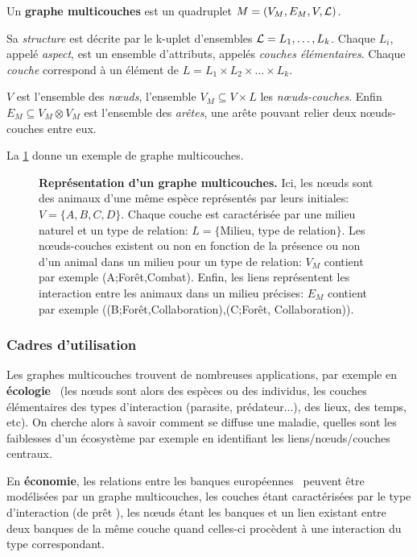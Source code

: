 \documentclass[11pt,a4paper]{article}
\theoremstyle{definition}
\theoremstyle{remark}
\theoremstyle{remark}
\begin{document}
 
 
  Un \textbf{graphe multicouches} est un quadruplet $M = (V_M, E_M, V, {\cal L})$.
  
 Sa {\em structure} est décrite par le k-uplet d'ensembles ${\cal L} = L_1, \dots , L_k$. Chaque $L_i$, appelé {\em aspect}, est un ensemble d'attributs, appelés {\em couches élémentaires}. Chaque {\em couche} correspond à un élément de $L=L_1\times L_2 \times \dots \times L_k$.\label{structure}
 
 $V$ est l'ensemble des {\em n\oe{}uds}, l'ensemble $V_M \subseteq V\times L$ les {\em n\oe{}uds-couches}. Enfin $E_M \subseteq V_M \otimes V_M $ est l'ensemble des {\em arêtes}, une arête pouvant relier deux n\oe{}uds-couches entre eux. 


 La \cref{exmulti} donne un exemple de graphe multicouches.

\begin{figure}[h]
	\centering
	
	\caption{\textbf{Représentation d'un graphe multicouches.} Ici, les n\oe{}uds sont des animaux d'une même espèce représentés par leurs initiales: $V = \{A ,B,C,D \}$. Chaque couche est caractérisée par une milieu naturel et un type de relation: $L = \{$Milieu, type de relation$\}$. Les n\oe{}uds-couches existent ou non en fonction de la présence ou non d'un animal dans un milieu pour un type de relation: $V_M$ contient par exemple (A;Forêt,Combat). Enfin, les liens représentent les interaction entre les animaux dans un milieu précises: $E_M$ contient par exemple ((B;Forêt,Collaboration),(C;Forêt, Collaboration)).}
	\label{exmulti}
\end{figure}

\subsubsection{Cadres d'utilisation}


Les graphes multicouches trouvent de nombreuses applications, par exemple en \textbf{écologie}~\cite{ecolo} (les n\oe{}uds sont alors des espèces ou des individus, les couches élémentaires des types d'interaction (parasite, prédateur...), des lieux, des temps, etc). On cherche alors à savoir comment se diffuse une maladie, quelles sont les faiblesses d'un écosystème par exemple en identifiant les liens/n\oe{}uds/couches centraux.

En \textbf{économie}, les relations entre les banques européennes~\cite{interbank} peuvent être modélisées par un graphe multicouches, les couches étant caractérisées par le type d'interaction (de \og prêt \fg{}), les n\oe{}uds étant les banques et un lien existant entre deux banques de la même couche quand celles-ci procèdent à une interaction du type correspondant.
\end{document}
